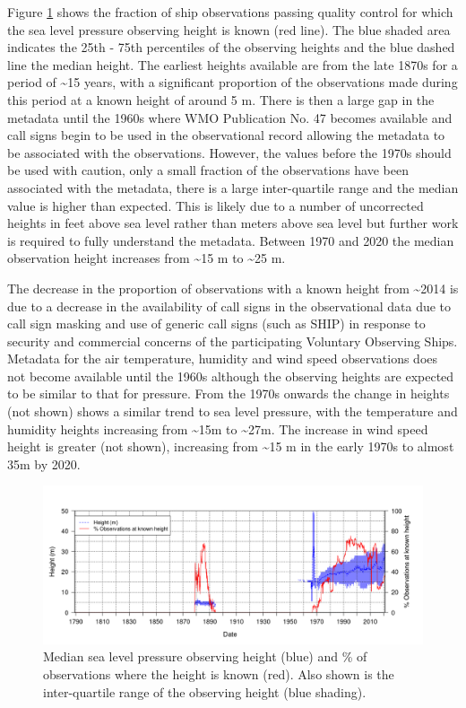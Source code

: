 Figure \ref{fig:slp_heights} shows the fraction of ship observations passing quality control for which the sea level pressure observing height is known (red line). The blue shaded area indicates the 25th - 75th percentiles of the observing heights and the blue dashed line the median height. 
The earliest heights available are from the late 1870s for a period of \sim 15 years, with a significant proportion of the observations made during this period at a known height of around 5 m. 
There is then a large gap in the metadata until the 1960s where WMO Publication No. 47 becomes available and call signs begin to be used in the observational record allowing the metadata to be associated with the observations. 
However, the values before the 1970s should be used with caution, only a small fraction of the observations have been associated with the metadata, there is a large inter-quartile range and the median value is higher than expected.
This is likely due to a number of uncorrected heights in feet above sea level rather than meters above sea level but further work is required to fully understand the metadata.
Between 1970 and 2020 the median observation height increases from \sim 15 m to \sim 25 m.

The decrease in the proportion of observations with a known height from \sim 2014 is due to a decrease in the availability of call signs in the observational data due to call sign masking and use of generic call signs (such as SHIP) in response to security and commercial concerns of the participating Voluntary Observing Ships.
Metadata for the air temperature, humidity and wind speed observations does not become available until the 1960s although the observing heights are expected to be similar to that for pressure. 
From the 1970s onwards the change in heights (not shown) shows a similar trend to sea level pressure, with the temperature and humidity heights increasing from \sim 15m to \sim 27m. 
The increase in wind speed height is greater (not shown), increasing from \sim 15 m in the early 1970s to almost 35m by 2020.

\begin{figure}[h]
    \includegraphics[width=18cm]{resources/brmh.png}
    \caption{Median sea level pressure observing height (blue) and \% of observations where the height is known (red). Also shown is the inter-quartile range of the observing height (blue shading).\\}
    \label{fig:slp_heights}
\end{figure}

